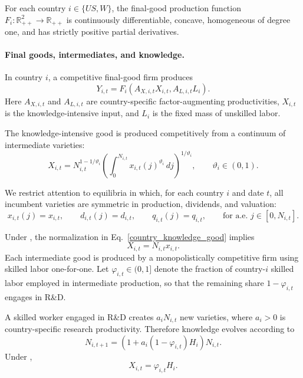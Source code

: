 \documentclass{article}
\begin{document}
\begin{ass}\label{ass_country_technology}
For each country $i\in\{US,W\}$, the final-good production function $F_i:\mathbb R_{++}^2\to\mathbb R_{++}$ is continuously differentiable, concave, homogeneous of degree one, and has strictly positive partial derivatives.
\end{ass}

\paragraph{Final goods, intermediates, and knowledge.}
In country $i$, a competitive final-good firm produces
\begin{equation}\label{country_final_good}
Y_{i,t}=F_i(A_{X,i,t}X_{i,t},A_{L,i,t}L_i).
\end{equation}
Here $A_{X,i,t}$ and $A_{L,i,t}$ are country-specific factor-augmenting productivities, $X_{i,t}$ is the knowledge-intensive input, and $L_i$ is the fixed mass of unskilled labor.

The knowledge-intensive good is produced competitively from a continuum of intermediate varieties:
\begin{equation}\label{country_knowledge_good}
X_{i,t}=N_{i,t}^{1-1/\vartheta_i}
\left(\int_0^{N_{i,t}} x_{i,t}(j)^{\vartheta_i}\,dj\right)^{1/\vartheta_i},
\qquad
\vartheta_i\in(0,1).
\end{equation}

\begin{ass}\label{ass_symmetric_varieties}
We restrict attention to equilibria in which, for each country $i$ and date $t$, all incumbent varieties are symmetric in production, dividends, and valuation:
\[
x_{i,t}(j)=x_{i,t},
\qquad
d_{i,t}(j)=d_{i,t},
\qquad
q_{i,t}(j)=q_{i,t},
\qquad
\text{for a.e. }j\in[0,N_{i,t}].
\]
\end{ass}

Under , the normalization in Eq.~\eqref{country_knowledge_good} implies
\[
X_{i,t}=N_{i,t}x_{i,t}.
\]
Each intermediate good is produced by a monopolistically competitive firm using skilled labor one-for-one. Let $\varphi_{i,t}\in(0,1]$ denote the fraction of country-$i$ skilled labor employed in intermediate production, so that the remaining share $1-\varphi_{i,t}$ engages in R\&D.

A skilled worker engaged in R\&D creates $a_iN_{i,t}$ new varieties, where $a_i>0$ is country-specific research productivity. Therefore knowledge evolves according to
\begin{equation}\label{country_knowledge_law}
N_{i,t+1}=(1+a_i(1-\varphi_{i,t})H_i)N_{i,t}.
\end{equation}
Under ,
\begin{equation}\label{country_X_phi}
X_{i,t}=\varphi_{i,t}H_i.
\end{equation}
\end{document}
